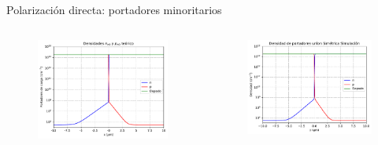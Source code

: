 \documentclass[aspectratio=169,xcolor=dvipsnames]{beamer}
\begin{document}
\begin{frame}{Polarización directa: portadores minoritarios}
    \begin{columns}
        \begin{column}{0.5\textwidth}
            \begin{figure}
                \includegraphics[width=0.90\linewidth]{Teorico/Bandas_Minoritarios-Directa.pdf}
            \end{figure}
        \end{column}
        \begin{column}{0.5\textwidth}
            \begin{figure}
                \includegraphics[width=0.90\linewidth]{Directa/Bandas_Minoritarios-Directa.pdf}
            \end{figure}
        \end{column}

\end{columns}
\end{frame}
\end{document}
